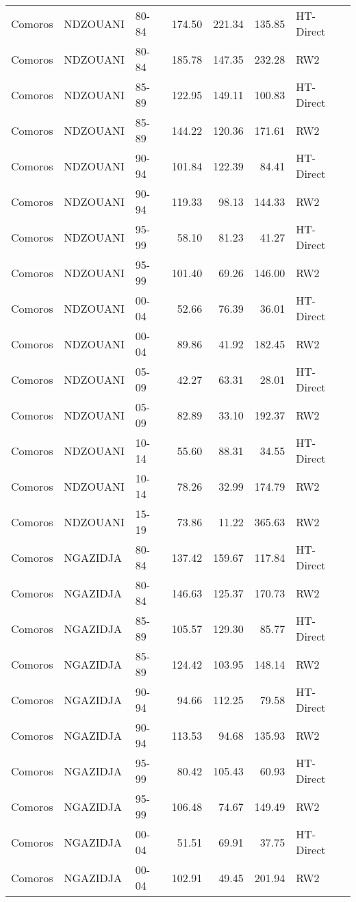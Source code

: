 \begin{longtable}{lllrrrl}
  Comoros & NDZOUANI & 80-84 & 174.50 & 221.34 & 135.85 & HT-Direct \\ 
  Comoros & NDZOUANI & 80-84 & 185.78 & 147.35 & 232.28 & RW2 \\ 
  Comoros & NDZOUANI & 85-89 & 122.95 & 149.11 & 100.83 & HT-Direct \\ 
  Comoros & NDZOUANI & 85-89 & 144.22 & 120.36 & 171.61 & RW2 \\ 
  Comoros & NDZOUANI & 90-94 & 101.84 & 122.39 & 84.41 & HT-Direct \\ 
  Comoros & NDZOUANI & 90-94 & 119.33 & 98.13 & 144.33 & RW2 \\ 
  Comoros & NDZOUANI & 95-99 & 58.10 & 81.23 & 41.27 & HT-Direct \\ 
  Comoros & NDZOUANI & 95-99 & 101.40 & 69.26 & 146.00 & RW2 \\ 
  Comoros & NDZOUANI & 00-04 & 52.66 & 76.39 & 36.01 & HT-Direct \\ 
  Comoros & NDZOUANI & 00-04 & 89.86 & 41.92 & 182.45 & RW2 \\ 
  Comoros & NDZOUANI & 05-09 & 42.27 & 63.31 & 28.01 & HT-Direct \\ 
  Comoros & NDZOUANI & 05-09 & 82.89 & 33.10 & 192.37 & RW2 \\ 
  Comoros & NDZOUANI & 10-14 & 55.60 & 88.31 & 34.55 & HT-Direct \\ 
  Comoros & NDZOUANI & 10-14 & 78.26 & 32.99 & 174.79 & RW2 \\ 
  Comoros & NDZOUANI & 15-19 & 73.86 & 11.22 & 365.63 & RW2 \\ 
  Comoros & NGAZIDJA & 80-84 & 137.42 & 159.67 & 117.84 & HT-Direct \\ 
  Comoros & NGAZIDJA & 80-84 & 146.63 & 125.37 & 170.73 & RW2 \\ 
  Comoros & NGAZIDJA & 85-89 & 105.57 & 129.30 & 85.77 & HT-Direct \\ 
  Comoros & NGAZIDJA & 85-89 & 124.42 & 103.95 & 148.14 & RW2 \\ 
  Comoros & NGAZIDJA & 90-94 & 94.66 & 112.25 & 79.58 & HT-Direct \\ 
  Comoros & NGAZIDJA & 90-94 & 113.53 & 94.68 & 135.93 & RW2 \\ 
  Comoros & NGAZIDJA & 95-99 & 80.42 & 105.43 & 60.93 & HT-Direct \\ 
  Comoros & NGAZIDJA & 95-99 & 106.48 & 74.67 & 149.49 & RW2 \\ 
  Comoros & NGAZIDJA & 00-04 & 51.51 & 69.91 & 37.75 & HT-Direct \\ 
  Comoros & NGAZIDJA & 00-04 & 102.91 & 49.45 & 201.94 & RW2 \\ 

\end{longtable}
